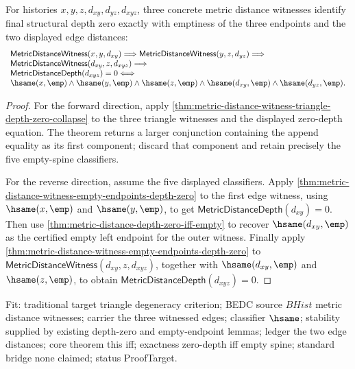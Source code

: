 \begin{theorem}
\label{thm:metric-distance-witness-triangle-depth-zero-iff-empty-spine}
For histories $x,y,z,d_{xy},d_{yz},d_{xyz}$, three concrete metric distance
witnesses identify final structural depth zero exactly with emptiness of the
three endpoints and the two displayed edge distances:
$$
\begin{array}{l}
\mathsf{MetricDistanceWitness}(x,y,d_{xy})\Longrightarrow
\mathsf{MetricDistanceWitness}(y,z,d_{yz})\Longrightarrow
\\
\mathsf{MetricDistanceWitness}(d_{xy},z,d_{xyz})\Longrightarrow
\\
\mathsf{MetricDistanceDepth}(d_{xyz})=0
\Longleftrightarrow
\\
\hsame(x,\emp)\land\hsame(y,\emp)\land\hsame(z,\emp)\land
\hsame(d_{xy},\emp)\land\hsame(d_{yz},\emp).
\end{array}
$$
\end{theorem}
\begin{proof}
For the forward direction, apply
\autoref{thm:metric-distance-witness-triangle-depth-zero-collapse} to the three
triangle witnesses and the displayed zero-depth equation. The theorem returns a
larger conjunction containing the append equality as its first component; discard
that component and retain precisely the five empty-spine classifiers.

For the reverse direction, assume the five displayed classifiers. Apply
\autoref{thm:metric-distance-witness-empty-endpoints-depth-zero} to the first
edge witness, using $\hsame(x,\emp)$ and $\hsame(y,\emp)$, to get
$\mathsf{MetricDistanceDepth}(d_{xy})=0$. Then use
\autoref{thm:metric-distance-depth-zero-iff-empty} to recover
$\hsame(d_{xy},\emp)$ as the certified empty left endpoint for the outer witness.
Finally apply
\autoref{thm:metric-distance-witness-empty-endpoints-depth-zero} to
$\mathsf{MetricDistanceWitness}(d_{xy},z,d_{xyz})$, together with
$\hsame(d_{xy},\emp)$ and $\hsame(z,\emp)$, to obtain
$\mathsf{MetricDistanceDepth}(d_{xyz})=0$.
\end{proof}

Fit: traditional target triangle degeneracy criterion; BEDC source $BHist$
metric distance witnesses; carrier the three witnessed edges; classifier
$\hsame$; stability supplied by existing depth-zero and empty-endpoint lemmas;
ledger the two edge distances; core theorem this iff; exactness zero-depth iff
empty spine; standard bridge none claimed; status ProofTarget.

